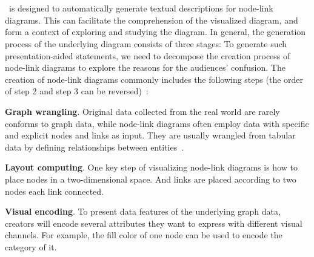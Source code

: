 \section{\ApproachName}

\ApproachName~is designed to automatically generate textual descriptions for node-link diagrams. This can facilitate the comprehension of the visualized diagram, and form a context of exploring and studying the diagram. In general, the generation process of the underlying diagram consists of three stages:
To generate such presentation-aided statements, we need to decompose the creation process of node-link diagrams to explore the reasons for the audiences' confusion.
The creation of node-link diagrams commonly includes the following steps (the order of step 2 and step 3 can be reversed)~\cite{DBLP:journals/cgf/SpritzerBDFF15, tvcg/RomatAP21}:
\begin{compactenum}
    \item \textbf{Graph wrangling}. Original data collected from the real world are rarely conforms to graph data, while node-link diagrams often employ data with specific and explicit nodes and links as input. They are usually wrangled from tabular data by defining relationships between entities~\cite{DBLP:journals/tvcg/SrinivasanPEB18, DBLP:conf/ieeevast/BigelowNML19, DBLP:journals/ivs/HeerP14, DBLP:journals/ivs/LiuNS14}.
    \item \textbf{Layout computing}. One key step of visualizing node-link diagrams is how to place nodes in a two-dimensional space. And links are placed according to two nodes each link connected.
    \item \textbf{Visual encoding}. To present data features of the underlying graph data, creators will encode several attributes they want to express with different visual channels. For example, the fill color of one node can be used to encode the category of it.
\end{compactenum}

